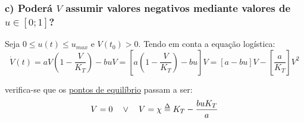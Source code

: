 \subsubsection[c) Poderá V assumir valores negativos mediante valores de u?]{c) Poderá $V$ assumir valores negativos mediante valores de $u \in [0; 1]$?}%
\label{subsubsec:P3c}
Seja $0 \leq u(t) \leq u_{max}$ e $V(t_0) > 0$. Tendo em conta a equação logística:
\vspace{-0.25em}
\begin{equation}
    \dot{V}(t) = aV\left(1-\frac{V}{K_T}\right) - buV = \left[ a\left( 1-\frac{V}{K_T} \right) - bu \right]V = [a-bu]V-\left[\frac{a}{K_T}\right]V^2
\end{equation}

\vspace{-0.25em}
\noindent verifica-se que os \underline{pontos de equilíbrio} passam a ser:
\vspace{-0.75em}
$$
    V = 0\quad\lor\quad V = \chi \delequal K_T-\frac{buK_T}{a}
$$
\vspace{-2.25em}
